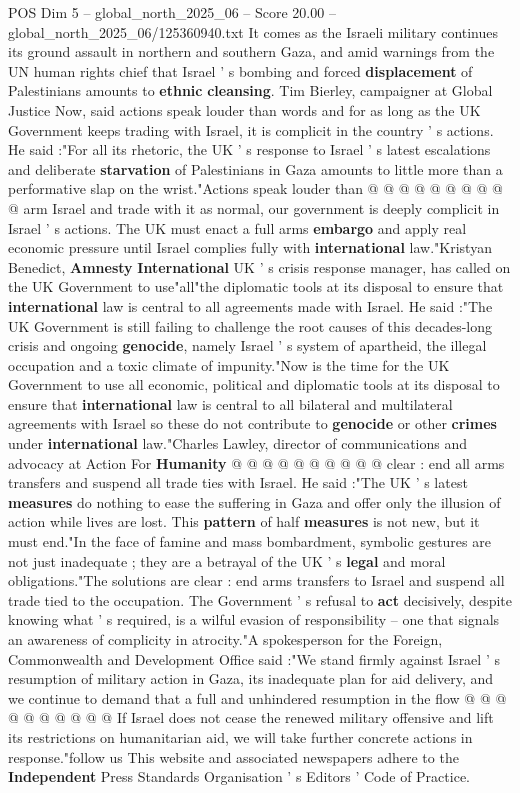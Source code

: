 \begin{textsample}{POS Dim 5 – global\_north\_2025\_06 – Score 20.00 – global\_north\_2025\_06/125360940.txt}
It comes as the Israeli military continues its ground assault in northern and southern Gaza, and amid warnings from the UN human rights chief that Israel ' s bombing and forced \textbf{displacement} of Palestinians amounts to \textbf{ethnic} \textbf{cleansing}.
Tim Bierley, campaigner at Global Justice Now, said actions speak louder than words and for as long as the UK Government keeps trading with Israel, it is complicit in the country ' s actions.
He said :"For all its rhetoric, the UK ' s response to Israel ' s latest escalations and deliberate \textbf{starvation} of Palestinians in Gaza amounts to little more than a performative slap on the wrist."Actions speak louder than @ @ @ @ @ @ @ @ @ @ arm Israel and trade with it as normal, our government is deeply complicit in Israel ' s actions.
The UK must enact a full arms \textbf{embargo} and apply real economic pressure until Israel complies fully with \textbf{international} law."Kristyan Benedict, \textbf{Amnesty} \textbf{International} UK ' s crisis response manager, has called on the UK Government to use"all"the diplomatic tools at its disposal to ensure that \textbf{international} law is central to all agreements made with Israel.
He said :"The UK Government is still failing to challenge the root causes of this decades-long crisis and ongoing \textbf{genocide}, namely Israel ' s system of apartheid, the illegal occupation and a toxic climate of impunity."Now is the time for the UK Government to use all economic, political and diplomatic tools at its disposal to ensure that \textbf{international} law is central to all bilateral and multilateral agreements with Israel so these do not contribute to \textbf{genocide} or other \textbf{crimes} under \textbf{international} law."Charles Lawley, director of communications and advocacy at Action For \textbf{Humanity} @ @ @ @ @ @ @ @ @ @ clear : end all arms transfers and suspend all trade ties with Israel.
He said :"The UK ' s latest \textbf{measures} do nothing to ease the suffering in Gaza and offer only the illusion of action while lives are lost.
This \textbf{pattern} of half \textbf{measures} is not new, but it must end."In the face of famine and mass bombardment, symbolic gestures are not just inadequate ; they are a betrayal of the UK ' s \textbf{legal} and moral obligations."The solutions are clear : end arms transfers to Israel and suspend all trade tied to the occupation.
The Government ' s refusal to \textbf{act} decisively, despite knowing what ' s required, is a wilful evasion of responsibility -- one that signals an awareness of complicity in atrocity."A spokesperson for the Foreign, Commonwealth and Development Office said :"We stand firmly against Israel ' s resumption of military action in Gaza, its inadequate plan for aid delivery, and we continue to demand that a full and unhindered resumption in the flow @ @ @ @ @ @ @ @ @ @ If Israel does not cease the renewed military offensive and lift its restrictions on humanitarian aid, we will take further concrete actions in response."follow us This website and associated newspapers adhere to the \textbf{Independent} Press Standards Organisation ' s Editors ' Code of Practice.

\end{textsample}
